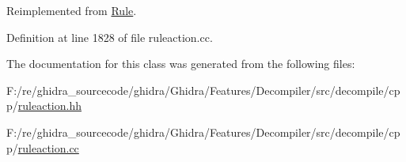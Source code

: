 Reimplemented from \mbox{\hyperlink{class_rule_a4023bfc7825de0ab866790551856d10e}{Rule}}.



Definition at line 1828 of file ruleaction.\+cc.



The documentation for this class was generated from the following files\+:\begin{DoxyCompactItemize}
\item 
F\+:/re/ghidra\+\_\+sourcecode/ghidra/\+Ghidra/\+Features/\+Decompiler/src/decompile/cpp/\mbox{\hyperlink{ruleaction_8hh}{ruleaction.\+hh}}\item 
F\+:/re/ghidra\+\_\+sourcecode/ghidra/\+Ghidra/\+Features/\+Decompiler/src/decompile/cpp/\mbox{\hyperlink{ruleaction_8cc}{ruleaction.\+cc}}\end{DoxyCompactItemize}
